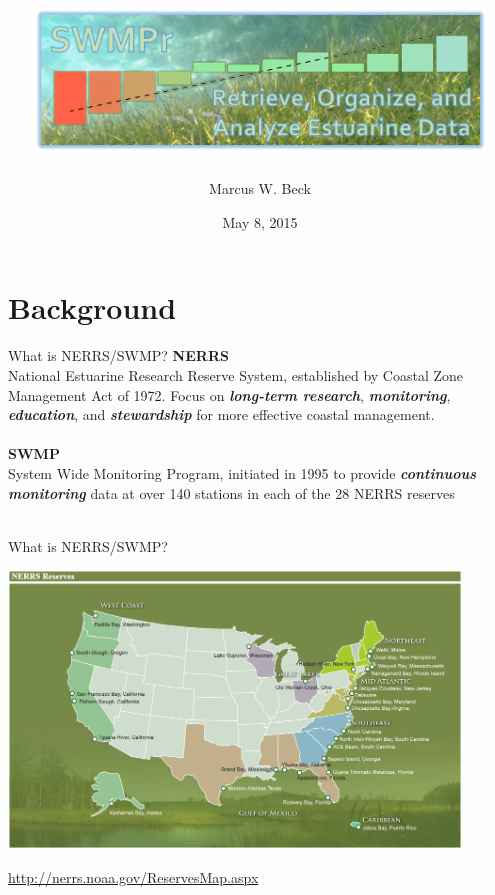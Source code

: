 \documentclass[serif]{beamer}\usepackage[]{graphicx}\usepackage[]{color}
\newcommand{\Bigtxt}[1]{\textbf{\textit{#1}}}
\begin{document}
\title[SWMPr for estuarine time series]{\includegraphics[width=0.9\textwidth]{fig/swmpr_logo.png}}

\author[M. Beck]{Marcus W. Beck}

\date{May 8, 2015}


\begin{frame}
\titlepage
\end{frame}

\section{Background}

\begin{frame}{What is NERRS/SWMP?}{}
{\bf NERRS}\\
National Estuarine Research Reserve System, established by Coastal Zone Management Act of 1972. Focus on \Bigtxt{long-term research}, \Bigtxt{monitoring}, \Bigtxt{education}, and \Bigtxt{stewardship} for more effective coastal management.\\~\\
{\bf SWMP}\\
System Wide Monitoring Program, initiated in 1995 to provide \Bigtxt{continuous monitoring} data at over 140 stations in each of the 28 NERRS reserves \\~\\
\end{frame}

\begin{frame}{What is NERRS/SWMP?}
\centerline{\includegraphics[width = 0.9\textwidth]{fig/NERRS_locations.png}}
\tiny
\flushright
\href{http://nerrs.noaa.gov/ReservesMap.aspx}{http://nerrs.noaa.gov/ReservesMap.aspx}
\end{frame}
\end{document}
